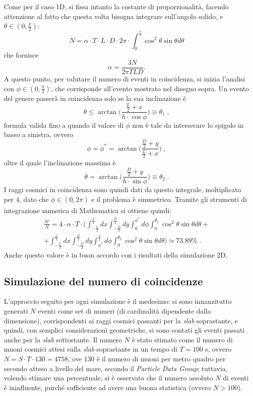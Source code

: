 Come per il caso 1D, si fissa intanto la costante di proporzionalità, facendo attenzione al fatto che questa volta bisogna integrare sull'angolo solido, e $\theta\in(0,\frac{\pi}{2})$: 
$$N = \alpha \cdot T \cdot L \cdot D \cdot 2\pi \cdot \int_{0}^{\frac{\pi}{2}} \cos^2\theta  \sin\theta d\theta$$
che fornisce 
$$\alpha = \frac{3N}{2\pi TLD}.$$ 
A questo punto, per valutare il numero di eventi in coincidenza, si inizia l'analisi con $\phi\in(0, \frac{\pi}{2})$, che corrisponde all'evento mostrato nel disegno sopra. Un evento del genere passerà in coincidenza solo se la sua inclinazione è $$\theta \leq \arctan \bigg(\frac{\frac{L}{2}+x}{h\cdot \cos\phi}\bigg) \equiv \theta_1\;,$$ formula valida fino a quando il valore di $\phi$ non è tale da intersecare lo spigolo in basso a sinistra, ovvero $$\phi = \phi^{*} = \arctan \bigg(\frac{\frac{D}{2}+y}{\frac{L}{2}+x}\bigg)\;,$$ oltre il quale l'inclinazione massima è $$\theta = \arctan \bigg(\frac{\frac{D}{2}+y}{h\cdot \sin\phi}\bigg)  \equiv \theta_2\;.$$I raggi cosmici in coincidenza sono quindi dati da questo integrale, moltiplicato per 4, dato che $\phi\in(0, 2\pi)$ e il problema è simmetrico. Tramite gli strumenti di integrazione numerica di Mathematica\textsuperscript{\textregistered} si ottiene quindi:
\begin{multline*}
\frac{N'}{N}=4\cdot \alpha \cdot T\cdot \bigg( \int_{-\frac{L}{2}}^{\frac{L}{2}} dx \int_{-\frac{D}{2}}^{\frac{D}{2}} dy \int_0^{\phi^{*}} d\phi \int_0^{\theta_1} \cos^2\theta \sin\theta d\theta +\\
+ \int_{-\frac{L}{2}}^{\frac{L}{2}} dx \int_{-\frac{D}{2}}^{\frac{D}{2}} dy \int_{\phi^{*}}^{\frac{\pi}{2}} d\phi \int_0^{\theta_2} \cos^2\theta \sin\theta d\theta\bigg)\simeq 73.89 \%\;.
\end{multline*} 
Anche questo valore è in buon accordo con i risultati della simulazione 2D.

\subsection{Simulazione del numero di coincidenze}
L'approccio seguito per ogni simulazione è il medesimo: si sono innanzitutto generati $N$ eventi come set di numeri (di cardinalità dipendente dalla dimensione), corrispondenti ai raggi cosmici passanti per la \emph{slab} soprastante, e quindi, con semplici considerazioni geometriche, si sono contati gli eventi passati anche per la \emph{slab} sottostante. Il numero $N$ è stato stimato come il numero di muoni cosmici attesi sulla \emph{slab} soprastante in un tempo di $T=100$ s, ovvero $N=S\cdot T\cdot 130=4758$, ove $130$ è il numero di muoni per metro quadro per secondo atteso a livello del mare, secondo il \emph{Particle Data Group}; tuttavia, volendo stimare una percentuale, si è osservato che il numero assoluto $N$ di eventi è ininfluente, purché sufficiente ad avere una buona statistica (ovvero $N>100$).


